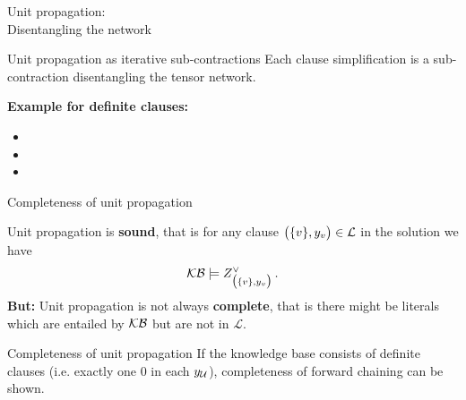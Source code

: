 \documentclass{beamer}
\begin{document}
    \begin{frame}{Unit propagation: \\ Disentangling the network}

        \begin{block}{Unit propagation as iterative sub-contractions}
            Each clause simplification is a sub-contraction disentangling the tensor network.
        \end{block}

        \par \medskip
        \begin{minipage}{0.45\textwidth}
            {\bf Example for definite clauses:}
        \begin{itemize}
            \item {}
            \item {}
            \item {}
        \end{itemize}
        \end{minipage}
        \begin{minipage}{0.45\textwidth}
            
        \end{minipage}
    \end{frame}

    \begin{frame}{Completeness of unit propagation}

        Unit propagation is {\bf sound}, that is for any clause $\big(\{v\},y_{v}\big)\in\mathcal{L}$ in the solution we have
        \begin{align*}
            \mathcal{KB} \models Z^{\lor}_{\big(\{v\},y_{v}\big)} \, .
        \end{align*}
        \medskip
        {\bf But:} Unit propagation is not always {\bf complete}, that is there might be literals which are entailed by $\mathcal{KB}$ but are not in $\mathcal{L}$.

        \medskip
        \begin{block}{Completeness of unit propagation}
            If the knowledge base consists of definite clauses (i.e. exactly one $0$ in each $y_{\mathcal{U}}$), completeness of forward chaining can be shown.
        \end{block}
    \end{frame}
\end{document}
